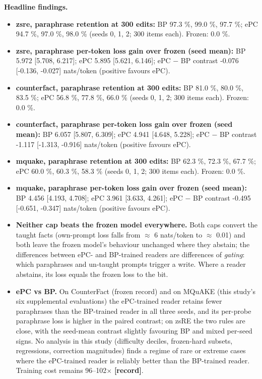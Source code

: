 \documentclass[10pt,a4paper]{article}
\begin{document}
\textbf{Headline findings.}



\begin{itemize}
\item \textbf{zsre, paraphrase retention at 300 edits:} BP 97.3 \%, 99.0 \%, 97.7 \%; ePC 94.7 \%, 97.0 \%, 98.0 \% (seeds 0, 1, 2; 300 items each). Frozen: 0.0 \%.
\item \textbf{zsre, paraphrase per-token loss gain over frozen (seed mean):} BP 5.972 [5.708, 6.217]; ePC 5.895 [5.621, 6.146]; ePC $-$ BP contrast -0.076 [-0.136, -0.027] nats/token (positive favours ePC).
\item \textbf{counterfact, paraphrase retention at 300 edits:} BP 81.0 \%, 80.0 \%, 83.5 \%; ePC 56.8 \%, 77.8 \%, 66.0 \% (seeds 0, 1, 2; 300 items each). Frozen: 0.0 \%.
\item \textbf{counterfact, paraphrase per-token loss gain over frozen (seed mean):} BP 6.057 [5.807, 6.309]; ePC 4.941 [4.648, 5.228]; ePC $-$ BP contrast -1.117 [-1.313, -0.916] nats/token (positive favours ePC).
\item \textbf{mquake, paraphrase retention at 300 edits:} BP 62.3 \%, 72.3 \%, 67.7 \%; ePC 60.0 \%, 60.3 \%, 58.3 \% (seeds 0, 1, 2; 300 items each). Frozen: 0.0 \%.
\item \textbf{mquake, paraphrase per-token loss gain over frozen (seed mean):} BP 4.456 [4.193, 4.708]; ePC 3.961 [3.633, 4.261]; ePC $-$ BP contrast -0.495 [-0.651, -0.347] nats/token (positive favours ePC).
\item \textbf{Neither cap beats the frozen model everywhere.} Both caps convert the taught facts (own-prompt loss falls from $\approx$ 6 nats/token to $\approx$ 0.01) and both leave the frozen model's behaviour unchanged where they abstain; the differences between ePC- and BP-trained readers are differences of \emph{gating}: which paraphrases and un-taught prompts trigger a write. Where a reader abstains, its loss equals the frozen loss to the bit.
\item \textbf{ePC vs BP.} On CounterFact (frozen record) and on MQuAKE (this study's six supplemental evaluations) the ePC-trained reader retains fewer paraphrases than the BP-trained reader in all three seeds, and its per-probe paraphrase loss is higher in the paired contrast; on zsRE the two rules are close, with the seed-mean contrast slightly favouring BP and mixed per-seed signs. No analysis in this study (difficulty deciles, frozen-hard subsets, regressions, correction magnitudes) finds a regime of rare or extreme cases where the ePC-trained reader is reliably better than the BP-trained reader. Training cost remains 96–102$\times$ \textbf{[record]}.

\end{itemize}
\end{document}
